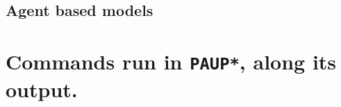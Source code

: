 \documentclass{article}
\begin{document}
\subsection{Agent based models}


\appendix

\newpage
\section{Commands run in \texttt{PAUP*}, along its output.} \label{sec:paup_code_0}





% 

% 
\end{document}
